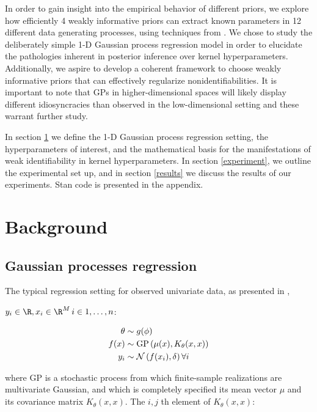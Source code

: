 \documentclass{article}
\newcommand{\lp}{\ensuremath{\left(}}
\newcommand{\rp}{\ensuremath{\right)}}
\begin{document}
In order to gain insight into the empirical behavior of different priors, we
explore how efficiently 4 weakly informative priors can extract known
parameters in 12 different data generating processes, using techniques from
\citet{cook2012validation}. We chose to study the deliberately simple 1-D
Gaussian process regression model in order to elucidate the pathologies
inherent in posterior inference over kernel hyperparameters. Additionally, we
aspire to develop a coherent framework to choose weakly informative priors that
can effectively regularize nonidentifiabilities. It is important to note that
GPs in higher-dimensional spaces will likely display different idiosyncracies
than observed in the low-dimensional setting and these warrant further study.

In section \ref{background} we define the 1-D Gaussian process regression setting,
the hyperparameters of interest, and the mathematical basis for the manifestations
of weak identifiability in kernel hyperparameters. In section \ref{experiment}, we 
outline the experimental set up, and in section \ref{results} we discuss the results 
of our experiments. Stan code is presented in the appendix.

\section{Background} \label{background}

\subsection{Gaussian processes regression}

The typical regression setting for observed univariate data, as presented in \citet{flaxman2015fast},

$y_i \in \R, x_i \in \R^M\, i \in {1,\dots,n}$:

\begin{align*}
  \theta & \sim g(\phi) \\
  f(x) & \sim \text{GP}\lp \mu(x),
  K_\theta(x, x) \rp \\
  y_i & \sim \mathcal{N}\lp f(x_i), \delta \rp \forall i \\
\end{align*}

where $\text{GP}$ is a stochastic process from which finite-sample realizations are
multivariate Gaussian, and which is completely specified its mean vector $\mu$
and its covariance matrix $K_\theta(x, x)$. The $i, j$ th
element of $K_\theta(x, x)$:
\end{document}
